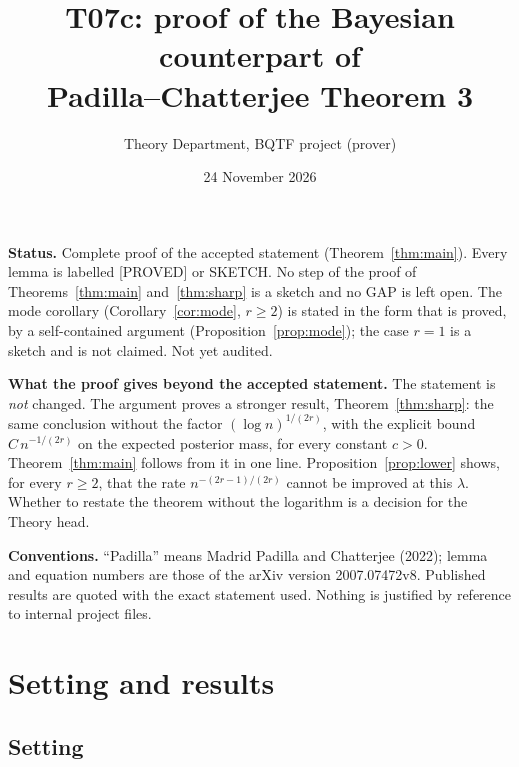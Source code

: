 \documentclass[11pt]{article}
\title{T07c: proof of the Bayesian counterpart of\\ Padilla--Chatterjee Theorem 3}
\author{Theory Department, BQTF project (prover)}
\date{24 November 2026}
\theoremstyle{definition}
\theoremstyle{remark}
\newcommand{\proved}{\textup{[PROVED]}}
\begin{document}
\maketitle

\noindent\textbf{Status.} Complete proof of the accepted statement (Theorem~\ref{thm:main}). Every lemma is labelled \proved{} or SKETCH. No step of the proof of Theorems~\ref{thm:main} and~\ref{thm:sharp} is a sketch and no GAP is left open. The mode corollary (Corollary~\ref{cor:mode}, $r\ge2$) is stated in the form that is proved, by a self-contained argument (Proposition~\ref{prop:mode}); the case $r=1$ is a sketch and is not claimed. Not yet audited.

\smallskip
\noindent\textbf{What the proof gives beyond the accepted statement.} The statement is \emph{not} changed. The argument proves a stronger result, Theorem~\ref{thm:sharp}: the same conclusion without the factor $(\log n)^{1/(2r)}$, with the explicit bound $C\,n^{-1/(2r)}$ on the expected posterior mass, for every constant $c>0$. Theorem~\ref{thm:main} follows from it in one line. Proposition~\ref{prop:lower} shows, for every $r\ge2$, that the rate $n^{-(2r-1)/(2r)}$ cannot be improved at this $\lambda$. Whether to restate the theorem without the logarithm is a decision for the Theory head.

\smallskip
\noindent\textbf{Conventions.} ``Padilla'' means Madrid Padilla and Chatterjee (2022); lemma and equation numbers are those of the arXiv version 2007.07472v8. Published results are quoted with the exact statement used. Nothing is justified by reference to internal project files.

\tableofcontents

\section{Setting and results}\label{sec:setting}

\subsection{Setting}
\end{document}
